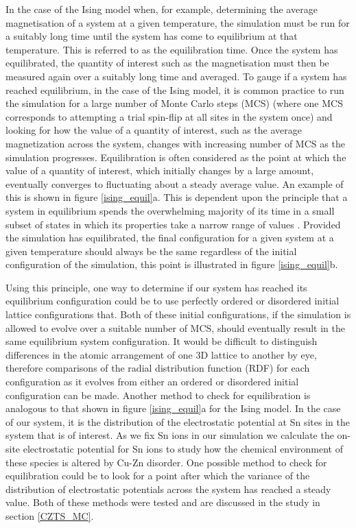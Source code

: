 \documentclass[11pt, twoside]{report}
\begin{document}
In the case of the Ising model when, for example, determining the average magnetisation of a system at a given temperature, the simulation must be run for a suitably long time until the system has come to equilibrium at that temperature. This is referred to as the equilibration time. Once the system has equilibrated, the quantity of interest such as the magnetisation must then be measured again over a suitably long time and averaged. 
To gauge if a system has reached equilibrium, in the case of the Ising model, it is common practice to run the simulation for a large number of Monte Carlo steps (MCS) (where one MCS corresponds to attempting a trial spin-flip at all sites in the system once) and looking for how the value of a quantity of interest, such as the average magnetization across the system, changes with increasing number of MCS as the simulation progresses. Equilibration is often considered as the point at which the value of a quantity of interest, which initially changes by a large amount, eventually converges to fluctuating about a steady average value. An example of this is shown in figure \ref{ising_equil}a. This is dependent upon the principle that a system in equilibrium spends the overwhelming majority of its time in a small subset of states in which its properties take a narrow range of values \cite{MC}. Provided the simulation has equilibrated, the final configuration for a given system at a given temperature should always be the same regardless of the initial configuration of the simulation, this point is illustrated in figure \ref{ising_equil}b.

Using this principle, one way to determine if our system has reached its equilibrium configuration could be to use perfectly ordered or disordered initial lattice configurations that. Both of these initial configurations, if the simulation is allowed to evolve over a suitable number of MCS, should eventually result in the same equilibrium system configuration. It would be difficult to distinguish differences in the atomic arrangement of one 3D lattice to another by eye, therefore comparisons of the radial distribution function (RDF) for each configuration as it evolves from either an ordered or disordered initial configuration can be made. 
Another method to check for equilibration is analogous to that shown in figure \ref{ising_equil}a for the Ising model. In the case of our system, it is the distribution of the electrostatic potential at Sn sites in the system that is of interest. As we fix Sn ions in our simulation we calculate the on-site electrostatic potential for Sn ions to study how the chemical environment of these species is altered by Cu-Zn disorder. One possible method to check for equilibration could be to look for a point after which the variance of the distribution of electrostatic potentials across the system has reached a steady value. Both of these methods were tested and are discussed in the study in section \ref{CZTS_MC}.
\end{document}

